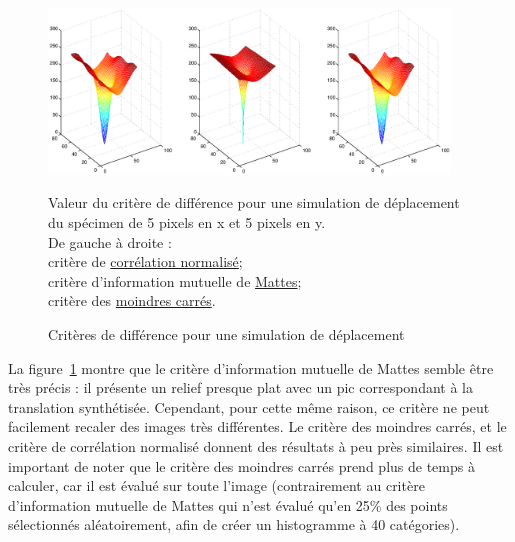 \begin{figure}[h]
\begin{center}
\leavevmode
\includegraphics[width=0.95\textwidth]{pictures/Recal3DmetricsCMSArtificial}
\end{center}
\caption{Critères de différence pour une simulation de déplacement}{Valeur du critère de différence pour une simulation de déplacement du spécimen de 5 pixels en x et 5 pixels en y.\\
De gauche à droite :\\
critère de \href{http://www.itk.org/Doxygen/html/classitk_1_1NormalizedCorrelationImageToImageMetric.html}{corrélation normalisé};\\
critère d'information mutuelle de \href{http://www.itk.org/Doxygen/html/classitk_1_1MattesMutualInformationImageToImageMetric.html}{Mattes};\\
critère des \href{http://www.itk.org/Doxygen/html/classitk_1_1MeanSquaresImageToImageMetric.html}{moindres carrés}. }
\label{fig:RecalMetricSynthe}
\end{figure}


La figure~\ref{fig:RecalMetricSynthe} montre que le critère d'information mutuelle de Mattes semble être très précis : il présente un relief presque plat avec un pic correspondant à la translation synthétisée. Cependant, pour cette même raison, ce critère ne peut facilement recaler des images très différentes.
Le critère des moindres carrés, et le critère de corrélation normalisé donnent des résultats à peu près similaires. Il est important de noter que le critère des moindres carrés prend plus de temps à calculer, car il est évalué sur toute l'image (contrairement au critère d'information mutuelle de Mattes qui n'est évalué qu'en 25\% des points sélectionnés aléatoirement, afin de créer un histogramme à 40 catégories).


